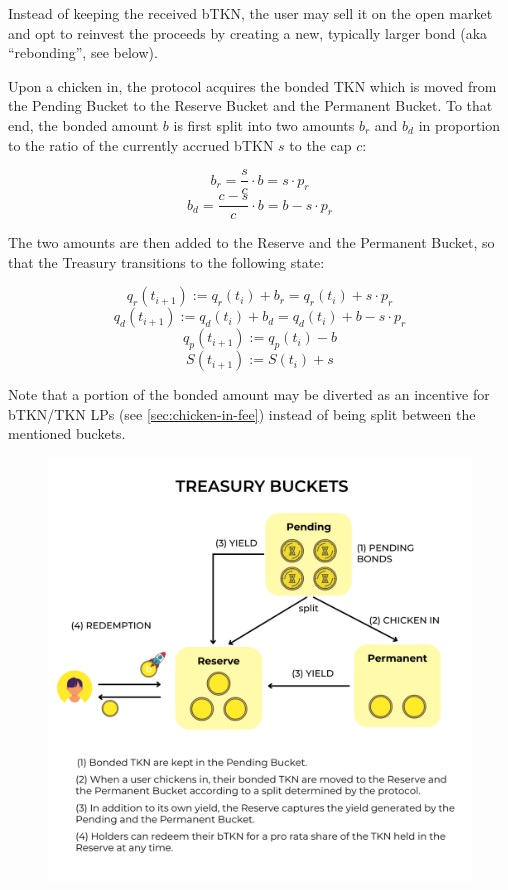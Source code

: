 \documentclass{article}
\begin{document}
Instead of keeping the received bTKN, the user may sell it on the open market and opt to reinvest the proceeds by creating a new, typically larger bond (aka “rebonding”, see below).

Upon a chicken in, the protocol acquires the bonded TKN which is moved from the Pending Bucket to the Reserve Bucket and the Permanent Bucket. To that end, the bonded amount $b$ is first split into two amounts $b_r$ and $b_d$ in proportion to the ratio of the currently accrued bTKN $s$ to the cap $c$:

\begin{equation}
  \label{eq:chicken-in-ba}
    b_r = \frac{s}{c} \cdot b = s \cdot p_r
\end{equation}
\begin{equation}
  \label{eq:chicken-in-bd}
    b_d = \frac{c-s}{c} \cdot b = b - s \cdot p_r
\end{equation}

The two amounts are then added to the Reserve and the Permanent Bucket, so that the Treasury transitions to the following state:

\begin{equation}
  \label{eq:chicken-in-qa}
    q_r(t_{i+1}) := q_r(t_i) + b_r = q_r(t_i) + s \cdot p_r
\end{equation}
\begin{equation}
  \label{eq:chicken-in-qd}
    q_d(t_{i+1}) := q_d(t_i) + b_d = q_d(t_i) + b - s \cdot p_r
\end{equation}
\begin{equation}
  \label{eq:chicken-in-qp}
    q_p(t_{i+1}) := q_p(t_i) - b
\end{equation}
\begin{equation}
  \label{eq:chicken-in-S}
    S(t_{i+1}) := S(t_i) + s
\end{equation}

Note that a portion of the bonded amount may be diverted as an incentive for bTKN/TKN LPs (see \ref{sec:chicken-in-fee}) instead of being split between the mentioned buckets.

\begin{figure}[ht]
    \centering
    \includegraphics[width=0.5\linewidth]{./treasury_text.png}
\end{figure}
\end{document}
